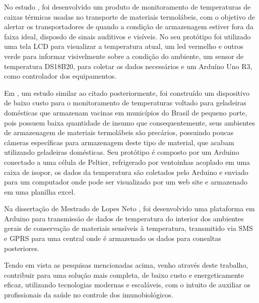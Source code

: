 No estudo \cite{lima2019controle}, foi desenvolvido um produto de monitoramento de temperaturas de caixas térmicas usadas no transporte de materiais termolábeis, com o  objetivo de alertar os transportadores de quando a condição de armazenagem estiver fora da faixa ideal, disposdo de sinais auditivos e visíveis. No seu protótipo foi utilizado uma tela LCD para visualizar a temperatura atual, um led vermelho e outros verde para informar visivelmente sobre a condição do ambiente, um sensor de temperatura DS18B20, para coletar os dados necessários e um Arduíno Uno R3, como controlador dos equipamentos.

Em \cite{kersbaum2019monitoramento}, um estudo similar ao citado posteriormente, foi construído um dispositivo de baixo custo para o monitoramento de temperaturas voltado para geladeiras domésticas que armazenam vacinas em municípios do Brasil de pequeno porte, pois possuem baixa quantidade de insumo que consequentemente, seus ambientes de armazenagem de materiais termolábeis são precários, possuindo poucas câmeras específicas para armazenagem deste tipo de material, que acabam utilizando geladeiras domésticas. Seu protótipo é composto por um Arduino conectado a uma célula de Peltier, refrigerado por ventoinhas acoplado em uma caixa de isopor, os dados da temperatura são coletados pelo Arduino e enviado para um computador onde pode ser visualizado por um web site e armazenado em uma planilha excel.

Na dissertação de Mestrado de Lopes Neto \cite{lopes2019monitoramento}, foi desenvolvido uma plataforma em Arduino para transmissão de dados de temperatura do interior dos ambientes gerais de conservação de materiais sensíveis à temperatura, transmitido via SMS e GPRS para uma central onde é armazenado os dados para consultas posteriores.

Tendo em vista as pesquisas mencionadas acima, venho através deste trabalho, contribuir para uma solução mais completa, de baixo custo e energeticamente eficaz, utilizando tecnologias modernas e escaláveis, com o intuito de auxiliar os profissionais da saúde no controle dos imunobiológicos.